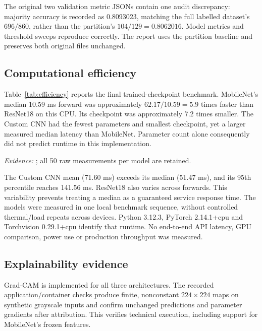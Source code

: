 \documentclass[11pt,a4paper]{article}
\newcommand{\code}[1]{\texttt{\detokenize{#1}}}
\newcommand{\source}[1]{{\footnotesize\textit{Evidence:} #1}}
\begin{document}
The original two validation metric JSONs contain one audit discrepancy: majority accuracy is recorded as 0.8093023, matching the full labelled dataset's $696/860$, rather than the partition's $104/129=0.8062016$. Model metrics and threshold sweeps reproduce correctly. The report uses the partition baseline and preserves both original files unchanged.

\subsection{Computational efficiency}
Table~\ref{tab:efficiency} reports the final trained-checkpoint benchmark. MobileNet's median 10.59 ms forward was approximately $62.17/10.59=5.9$ times faster than ResNet18 on this CPU. Its checkpoint was approximately 7.2 times smaller. The Custom CNN had the fewest parameters and smallest checkpoint, yet a larger measured median latency than MobileNet. Parameter count alone consequently did not predict runtime in this implementation.

\begin{table}[htbp]
\centering\small
\caption{Measured CPU model-forward latency and checkpoint size. Intel Core i7-7500U; float32; batch 1; $224\times224$ inputs; two intra-op threads, one inter-op thread; ten warm-ups and 50 timed forwards per model. MobileNetV3-Small is the post-hoc exploratory model.}
\label{tab:efficiency}

\par\source{\code{reports/model_efficiency.json}; all 50 raw measurements per model are retained.}
\end{table}

The Custom CNN mean (71.60 ms) exceeds its median (51.47 ms), and its 95th percentile reaches 141.56 ms. ResNet18 also varies across forwards. This variability prevents treating a median as a guaranteed service response time. The models were measured in one local benchmark sequence, without controlled thermal/load repeats across devices. Python 3.12.3, PyTorch 2.14.1+cpu and Torchvision 0.29.1+cpu identify that runtime. No end-to-end API latency, GPU comparison, power use or production throughput was measured.

\subsection{Explainability evidence}
Grad-CAM is implemented for all three architectures. The recorded application/container checks produce finite, nonconstant $224\times224$ maps on synthetic grayscale inputs and confirm unchanged predictions and parameter gradients after attribution. This verifies technical execution, including support for MobileNet's frozen features.
\end{document}
